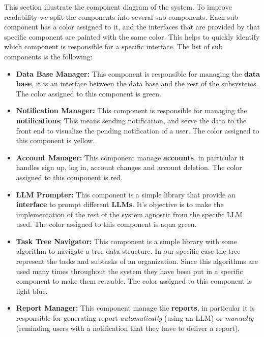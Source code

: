 \documentclass{article}
\begin{document}
This section illustrate the component diagram of the system. To improve readability we split the components into several sub
components.
Each sub component has a color assigned to it, and the interfaces that are provided by that specific component are painted with the same color.
This helps to quickly identify which component is responsible for a specific interface.
\newline \newline
The list of sub components is the following:
\begin{itemize}
    \item \textcolor[HTML]{8CC86E}{\textbf{Data Base Manager: }} This component is responsible for managing the \textbf{data base}, it is an interface between
          the data base and the rest of the subsystems. The color assigned to this component is \textcolor[HTML]{8CC86E}{green}.
    \item \textcolor[HTML]{F0C832}{\textbf{Notification Manager: }} This component is responsible for managing the \textbf{notifications};
          This means sending notification, and serve the data to the front end to visualize the pending notification of a user. The color assigned to this component is \textcolor[HTML]{F0C832}{yellow}.
    \item \textcolor[HTML]{FF0000}{\textbf{Account Manager: }} This component manage \textbf{accounts}, in particular it handles sign up, log in, account changes and account deletion.
          The color assigned to this component is \textcolor[HTML]{FF0000}{red}.
    \item \textcolor[HTML]{64C8BE}{\textbf{LLM Prompter: }} This component is a simple library that provide an \textbf{interface} to prompt different \textbf{LLMs}. It's objective is to make the
          implementation of the rest of the system agnostic from the specific LLM used. The color assigned to this component is \textcolor[HTML]{64C8BE}{aqua green}.
    \item \textcolor[HTML]{A0C8F0}{\textbf{Task Tree Navigator: }} This component is a simple library with some algorithm to navigate a tree data structure.
          In our specific case the tree represent the tasks and subtasks of an organization. Since this algorithms are used many
          times throughout the system they have been put in a specific component to make them reusable. The color assigned to this component is \textcolor[HTML]{A0C8F0}{light blue}.
    \item \textcolor[HTML]{FA9646}{\textbf{Report Manager: }} This component manage the \textbf{reports}, in particular it is responsible for generating report \textit{automatically} (using an LLM) or \textit{manually} (reminding users with a notification that they have to deliver a report).

\end{itemize}
\end{document}
